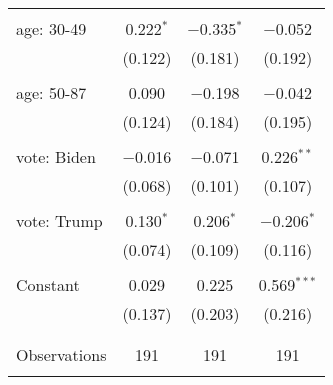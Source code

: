 \begin{tabular}{@{\extracolsep{5pt}}lccc}
  & & & \\ 
 age: 30-49 & 0.222$^{*}$ & $-$0.335$^{*}$ & $-$0.052 \\ 
  & (0.122) & (0.181) & (0.192) \\ 
  & & & \\ 
 age: 50-87 & 0.090 & $-$0.198 & $-$0.042 \\ 
  & (0.124) & (0.184) & (0.195) \\ 
  & & & \\ 
 vote: Biden & $-$0.016 & $-$0.071 & 0.226$^{**}$ \\ 
  & (0.068) & (0.101) & (0.107) \\ 
  & & & \\ 
 vote: Trump & 0.130$^{*}$ & 0.206$^{*}$ & $-$0.206$^{*}$ \\ 
  & (0.074) & (0.109) & (0.116) \\ 
  & & & \\ 
 Constant & 0.029 & 0.225 & 0.569$^{***}$ \\ 
  & (0.137) & (0.203) & (0.216) \\ 
  & & & \\ 
\hline \\[-1.8ex] 

Observations & 191 & 191 & 191 \\ 
\hline 
\hline \\[-1.8ex] 
\end{tabular} 